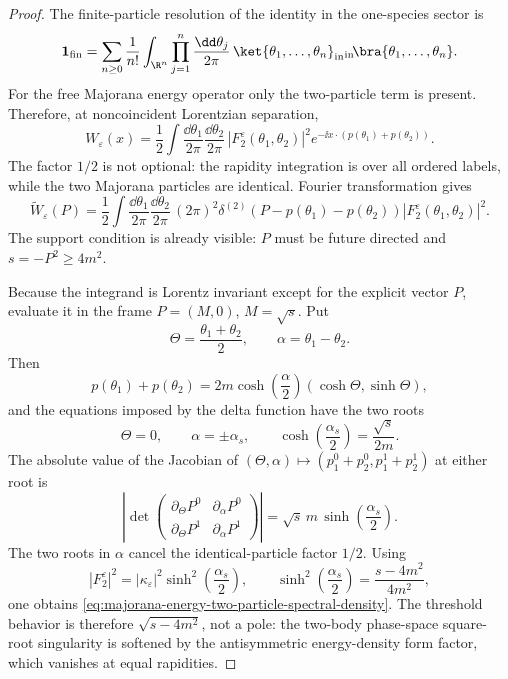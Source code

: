 \begin{proof}
The finite-particle resolution of the identity in the one-species sector is
\[
  \mathbf 1_{\rm fin}
  =
  \sum_{n\ge0}\frac{1}{n!}
  \int_{\R^n}\prod_{j=1}^n\frac{\dd\theta_j}{2\pi}\,
  \ket{\theta_1,\ldots,\theta_n}_{\rm in}
  {}_{\rm in}\!\bra{\theta_1,\ldots,\theta_n}.
\]
For the free Majorana energy operator only the two-particle term is present.
Therefore, at noncoincident Lorentzian separation,
\[
  W_\varepsilon(x)
  =
  \frac12
  \int\frac{\dd\theta_1}{2\pi}\frac{\dd\theta_2}{2\pi}\,
  \left|F_2^\varepsilon(\theta_1,\theta_2)\right|^2
  e^{-\ii x\cdot(p(\theta_1)+p(\theta_2))}.
\]
The factor \(1/2\) is not optional: the rapidity integration is over all
ordered labels, while the two Majorana particles are identical.  Fourier
transformation gives
\[
  \widetilde W_\varepsilon(P)
  =
  \frac12
  \int\frac{\dd\theta_1}{2\pi}\frac{\dd\theta_2}{2\pi}\,
  (2\pi)^2\delta^{(2)}(P-p(\theta_1)-p(\theta_2))
  \left|F_2^\varepsilon(\theta_1,\theta_2)\right|^2 .
\]
The support condition is already visible: \(P\) must be future directed and
\(s=-P^2\ge4m^2\).

Because the integrand is Lorentz invariant except for the explicit vector
\(P\), evaluate it in the frame \(P=(M,0)\), \(M=\sqrt s\).  Put
\[
  \Theta=\frac{\theta_1+\theta_2}{2},
  \qquad
  \alpha=\theta_1-\theta_2 .
\]
Then
\[
  p(\theta_1)+p(\theta_2)
  =
  2m\cosh\!\left(\frac{\alpha}{2}\right)
  (\cosh\Theta,\sinh\Theta),
\]
and the equations imposed by the delta function have the two roots
\[
  \Theta=0,\qquad
  \alpha=\pm\alpha_s,\qquad
  \cosh\!\left(\frac{\alpha_s}{2}\right)=\frac{\sqrt s}{2m}.
\]
The absolute value of the Jacobian of
\((\Theta,\alpha)\mapsto(p^0_1+p^0_2,p^1_1+p^1_2)\) at either root is
\[
  \left|
  \det
  \begin{pmatrix}
  \partial_\Theta P^0 & \partial_\alpha P^0\\
  \partial_\Theta P^1 & \partial_\alpha P^1
  \end{pmatrix}
  \right|
  =
  \sqrt s\,m\,\sinh\!\left(\frac{\alpha_s}{2}\right).
\]
The two roots in \(\alpha\) cancel the identical-particle factor \(1/2\).
Using
\[
  \left|F_2^\varepsilon\right|^2
  =
  |\kappa_\varepsilon|^2
  \sinh^2\!\left(\frac{\alpha_s}{2}\right),
  \qquad
  \sinh^2\!\left(\frac{\alpha_s}{2}\right)
  =
  \frac{s-4m^2}{4m^2},
\]
one obtains \eqref{eq:majorana-energy-two-particle-spectral-density}.
The threshold behavior is therefore \(\sqrt{s-4m^2}\), not a pole: the
two-body phase-space square-root singularity is softened by the antisymmetric
energy-density form factor, which vanishes at equal rapidities.


\end{proof}
